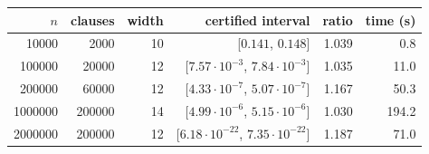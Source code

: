 \begin{tabular}{rrrrrr}
\toprule
$n$ & clauses & width & certified interval & ratio & time (s)\\
\midrule
10000 & 2000 & 10 & [$0.141$, $0.148$] & 1.039 & 0.8\\
100000 & 20000 & 12 & [$7.57\cdot10^{-3}$, $7.84\cdot10^{-3}$] & 1.035 & 11.0\\
200000 & 60000 & 12 & [$4.33\cdot10^{-7}$, $5.07\cdot10^{-7}$] & 1.167 & 50.3\\
1000000 & 200000 & 14 & [$4.99\cdot10^{-6}$, $5.15\cdot10^{-6}$] & 1.030 & 194.2\\
2000000 & 200000 & 12 & [$6.18\cdot10^{-22}$, $7.35\cdot10^{-22}$] & 1.187 & 71.0\\
\bottomrule
\end{tabular}
